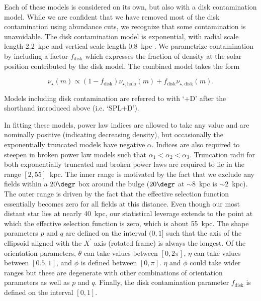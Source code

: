 Each of these models is considered on its own, but also with a disk contamination model. While we are confident that we have removed most of the disk contamination using abundance cuts, we recognize that some contamination is unavoidable. The disk contamination model is exponential, with radial scale length 2.2~kpc and vertical scale length 0.8~kpc \parencite{mackereth17}. We parametrize contamination by including a factor $f_\mathrm{disk}$ which expresses the fraction of density at the solar position contributed by the disk model. The combined model takes the form

\begin{equation}
\label{eq:disk-contamination}
\nu_{\star} (m) \propto (1-f_\mathrm{disk}) \nu_{\star,\mathrm{halo}}(m) + f_\mathrm{disk} \nu_{\star,\mathrm{disk}}(m) .
\end{equation}

\noindent Models including disk contamination are referred to with `+D' after the shorthand introduced above (i.e. `SPL+D').

In fitting these models, power law indices are allowed to take any value and are nominally positive (indicating decreasing density), but occasionally the exponentially truncated models have negative $\alpha$. Indices are also required to steepen in broken power law models such that $\alpha_{1} < \alpha_{2} < \alpha_{3}$. Truncation radii for both exponentially truncated and broken power laws are required to lie in the range $[2,55]$~kpc. The inner range is motivated by the fact that we exclude any fields within a $20\degr$ box around the bulge ($20\degr$ at $\sim 8$~kpc is $\sim 2$~kpc). The outer range is driven by the fact that the effective selection function essentially becomes zero for all fields at this distance. Even though our most distant star lies at nearly 40~kpc, our statistical leverage extends to the point at which the effective selection function is zero, which is about 55~kpc. The shape parameters $p$ and $q$ are defined on the interval $(0,1]$ such that the axis of the ellipsoid aligned with the $X^{\prime}$ axis (rotated frame) is always the longest. Of the orientation parameters, $\theta$ can take values between $[0,2\pi]$, $\eta$ can take values between $[0.5,1]$, and $\phi$ is defined between $[0,\pi]$. $\eta$ and $\phi$ could take wider ranges but these are degenerate with other combinations of orientation parameters as well as $p$ and $q$. Finally, the disk contamination parameter $f_\mathrm{disk}$ is defined on the interval $[0,1]$.

